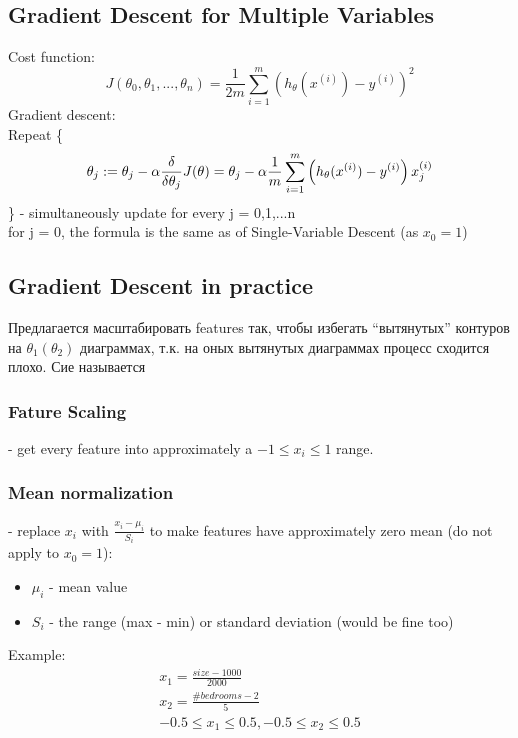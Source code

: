 \documentclass{scrartcl}
\begin{document}
\subsection {Gradient Descent for Multiple Variables}
Cost function:
\[
J(\theta_0, \theta_1, ..., \theta_n) = \frac{1}{2m}
\sum\limits_{i=1}^m\left(h_\theta(x^{(i)}) - y^{(i)} \right)^2
\]
Gradient descent: \\
Repeat \{
\[ \theta_j := \theta_j - \alpha \frac
{\delta}{\delta\theta_j}J(\theta) \\
= \theta_j - \alpha \frac{1}{m}
\sum\limits_{i=1}^m\left(h_\theta(x^{(i)}) - y^{(i)}
\right)x_j^{(i)} \]
\} - simultaneously update for every j = 0,1,...n \\
for j = 0, the formula is the same as of Single-Variable Descent (as
$x_0 = 1$)
\label {4-3}
\subsection {Gradient Descent in practice}
Предлагается масштабировать features так, чтобы избегать ``вытянутых''
контуров на $\theta_1(\theta_2)$ диаграммах, т.к. на оных вытянутых
диаграммах процесс сходится плохо. Сие называется

\subsubsection{ Fature Scaling} 
- get every feature into approximately a $-1 \leq x_i \leq 1$ range.
\subsubsection {Mean normalization}
- replace $x_i$ with $\frac{x_i - \mu_i}{S_i}$ to make features have
approximately zero mean (do not apply to $x_0 = 1$):
\begin{itemize}
\item{$\mu_i$} - mean value
\item{$S_i$} - the range (max - min) or standard deviation (would be
  fine too)
\end{itemize}
Example:
\begin{equation*}
  \begin{split}
    x_1 = \frac{size-1000}{2000} \\
    x_2 = \frac{\#bedrooms-2}{5} \\
    -0.5 \leq x_1 \leq 0.5, -0.5 \leq x_2 \leq 0.5
  \end{split}
\end{equation*}
\end{document}
